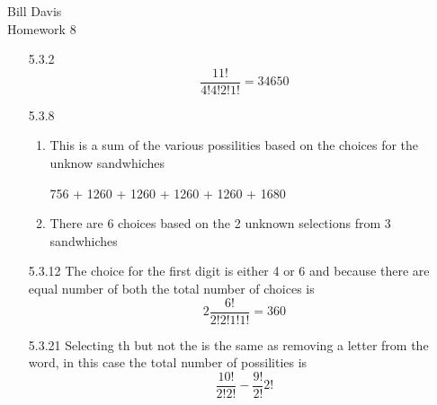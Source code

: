 \documentclass{article}
\begin{document}
Bill Davis\\
Homework 8

\begin{enumerate}

\item[5.3.2]
\[
\frac{11!}{4!4!2!1!} = 34650
\]

\item[5.3.8]
\begin{enumerate}
\item
This is a sum of the various possilities based on the choices for the unknow sandwhiches 

756 + 1260 + 1260 + 1260 + 1260 + 1680
\item
There are 6 choices based on the 2 unknown selections from 3 sandwhiches
\end{enumerate}

\item[5.3.12]
The choice for the first digit is either 4 or 6 and because there are equal number of both the total number of choices is 
\[
2\frac{6!}{2! 2! 1! 1!} = 360
\]

\item[5.3.21]
Selecting th but not the is the same as removing a letter from the word, in this case the total number of possilities is 
\[
\frac{10!}{2!2!} - \frac{9!}{2!}{2!}
\]

\end{enumerate}
\end{document}
